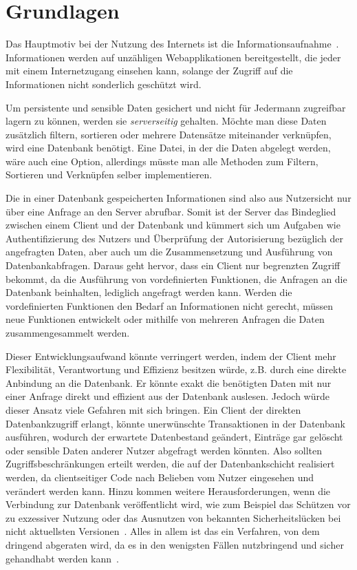 
\chapter{Grundlagen}
\label{sec:basics}
Das Hauptmotiv bei der Nutzung des Internets ist die In\-for\-ma\-tions\-auf\-nah\-me~\cite{statista-1}\cite{ard-zdf}.
Informationen werden auf unzähligen Webapplikationen bereitgestellt, die jeder mit einem Internetzugang einsehen kann,
solange der Zugriff auf die Informationen nicht sonderlich geschützt wird.

Um persistente und sensible Daten gesichert und nicht für Jedermann zugreifbar lagern zu können, werden sie \emph{serverseitig} gehalten.
Möchte man diese Daten zusätzlich filtern, sortieren oder mehrere Datensätze miteinander verknüpfen, wird eine Datenbank benötigt.
Eine Datei, in der die Daten abgelegt werden, wäre auch eine Option, allerdings müsste man alle Methoden zum Filtern, Sortieren und Verknüpfen
selber implementieren.

Die in einer Datenbank gespeicherten Informationen sind also aus Nutzersicht nur über eine Anfrage an den Server abrufbar.
Somit ist der Server das Bindeglied zwischen einem Client und der Datenbank und kümmert sich um Aufgaben wie Authentifizierung des Nutzers
und Überprüfung der Autorisierung bezüglich der angefragten Daten, aber auch um die Zusammensetzung und Ausführung von Datenbankabfragen.
Daraus geht hervor, dass ein Client nur begrenzten Zugriff bekommt, da die Ausführung von vordefinierten Funktionen, die Anfragen an die Datenbank beinhalten,
lediglich angefragt werden kann. Werden die vordefinierten Funktionen den Bedarf an Informationen nicht gerecht, müssen neue Funktionen entwickelt
oder mithilfe von mehreren Anfragen die Daten zusammengesammelt werden.

Dieser Entwicklungsaufwand könnte verringert werden, indem der Client mehr Flexibilität, Verantwortung und Effizienz besitzen würde,
z.B. durch eine direkte Anbindung an die Datenbank.
Er könnte exakt die benötigten Daten mit nur einer Anfrage direkt und effizient aus der Datenbank auslesen.
Jedoch würde dieser Ansatz viele Gefahren mit sich bringen. Ein Client der direkten Datenbankzugriff erlangt,
könnte unerwünschte Transaktionen in der Datenbank ausführen, wodurch der erwartete Datenbestand geändert,
Einträge gar gelöscht oder sensible Daten anderer Nutzer abgefragt werden könnten. Also sollten Zugriffsbeschränkungen erteilt werden, die
auf der Datenbankschicht realisiert werden, da clientseitiger Code nach Belieben vom Nutzer eingesehen und verändert werden kann.
Hinzu kommen weitere Herausforderungen, wenn die Verbindung zur Datenbank veröffentlicht wird,
wie zum Beispiel das Schützen vor zu exzessiver Nutzung oder das Ausnutzen von bekannten Sicherheitslücken bei nicht aktuellsten Versionen~\cite{postgresql-security}.
Alles in allem ist das ein Verfahren, von dem dringend abgeraten wird, da es in den wenigsten Fällen nutzbringend und sicher gehandhabt werden kann~\cite{client-to-database}.

